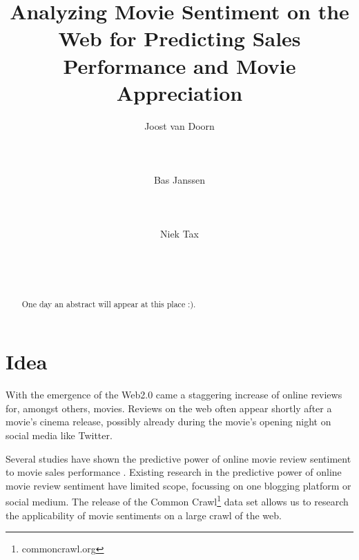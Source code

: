 \documentclass{sig-alternate-br}
\begin{document}

\title{Analyzing Movie Sentiment on the Web for Predicting Sales Performance and Movie Appreciation}

\author{
\alignauthor Joost van Doorn\\
       \\
       \\
       \\
\alignauthor Bas Janssen\\
       \\
       \\
       \\
\alignauthor Niek Tax\\
       \\
       \\
       \\
}

\maketitle
\begin{abstract}
One day an abstract will appear at this place :).
\end{abstract} 


\section{Idea}
With the emergence of the Web2.0 came a staggering increase of online reviews for, amongst others, movies. Reviews on the web often appear shortly after a movie's cinema release, possibly already during the movie's opening night on social media like Twitter. 

Several studies have shown the predictive power of online movie review sentiment to movie sales performance \cite{Mishne2006, Liu2007, Dellarocas2007, Asur2010, Joshi2010, Yu2012}. Existing research in the predictive power of online movie review sentiment have limited scope, focussing on one blogging platform or social medium. The release of the Common Crawl\footnote{commoncrawl.org} data set allows us to research the applicability of movie sentiments on a large crawl of the web.  
\end{document}
